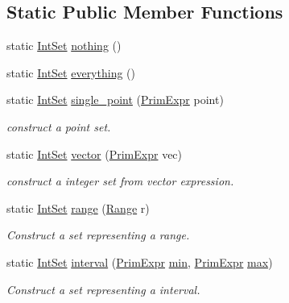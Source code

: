\subsection*{Static Public Member Functions}
\begin{DoxyCompactItemize}
\item 
static \hyperlink{classtvm_1_1arith_1_1IntSet}{Int\+Set} \hyperlink{classtvm_1_1arith_1_1IntSet_a5c4cd4c999b14280a237c0afd3360aca}{nothing} ()
\item 
static \hyperlink{classtvm_1_1arith_1_1IntSet}{Int\+Set} \hyperlink{classtvm_1_1arith_1_1IntSet_aaeffa7a1eb404803a88c5be3ca705090}{everything} ()
\item 
static \hyperlink{classtvm_1_1arith_1_1IntSet}{Int\+Set} \hyperlink{classtvm_1_1arith_1_1IntSet_aa6c7870804e1603736ae6c76d7179c6a}{single\+\_\+point} (\hyperlink{classtvm_1_1PrimExpr}{Prim\+Expr} point)
\begin{DoxyCompactList}\small\item\em construct a point set. \end{DoxyCompactList}\item 
static \hyperlink{classtvm_1_1arith_1_1IntSet}{Int\+Set} \hyperlink{classtvm_1_1arith_1_1IntSet_a3f8837f5cbe28739550a528214eb91c6}{vector} (\hyperlink{classtvm_1_1PrimExpr}{Prim\+Expr} vec)
\begin{DoxyCompactList}\small\item\em construct a integer set from vector expression. \end{DoxyCompactList}\item 
static \hyperlink{classtvm_1_1arith_1_1IntSet}{Int\+Set} \hyperlink{classtvm_1_1arith_1_1IntSet_afad6e9a1b54e9aa2b35c56cc9ebef168}{range} (\hyperlink{classtvm_1_1Range}{Range} r)
\begin{DoxyCompactList}\small\item\em Construct a set representing a range. \end{DoxyCompactList}\item 
static \hyperlink{classtvm_1_1arith_1_1IntSet}{Int\+Set} \hyperlink{classtvm_1_1arith_1_1IntSet_a56454f692fb041e6b51544c4f84f1420}{interval} (\hyperlink{classtvm_1_1PrimExpr}{Prim\+Expr} \hyperlink{classtvm_1_1arith_1_1IntSet_ab4b94806a72afc801f392b6c1e09b2bd}{min}, \hyperlink{classtvm_1_1PrimExpr}{Prim\+Expr} \hyperlink{classtvm_1_1arith_1_1IntSet_afc04d6fd5d46def5dff8f69d344df107}{max})
\begin{DoxyCompactList}\small\item\em Construct a set representing a interval. \end{DoxyCompactList}\end{DoxyCompactItemize}


